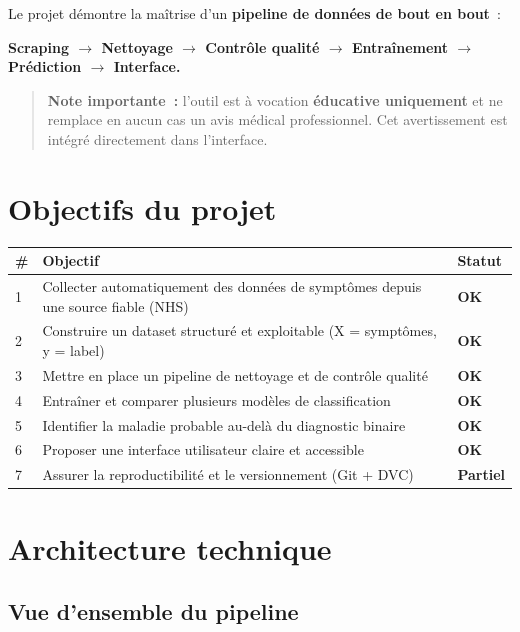 \documentclass[11pt,a4paper]{article}
\newcommand{\ok}{\textcolor{success}{\textbf{OK}}}
\newcommand{\partiel}{\textcolor{warning}{\textbf{Partiel}}}
\begin{document}
Le projet démontre la maîtrise d'un \textbf{pipeline de données de bout en bout}~:
\begin{center}
\textbf{Scraping $\rightarrow$ Nettoyage $\rightarrow$ Contrôle qualité $\rightarrow$ Entraînement $\rightarrow$ Prédiction $\rightarrow$ Interface.}
\end{center}

\begin{quote}
\textcolor{warning}{\textbf{Note importante~:}} l'outil est à vocation \textbf{éducative uniquement} et ne remplace en aucun cas un avis médical professionnel. Cet avertissement est intégré directement dans l'interface.
\end{quote}

\section{Objectifs du projet}

\begin{longtable}{@{}p{0.5cm} p{11.5cm} p{2cm}@{}}
\toprule
\textbf{\#} & \textbf{Objectif} & \textbf{Statut} \\
\midrule
\endhead
1 & Collecter automatiquement des données de symptômes depuis une source fiable (NHS) & \ok \\
2 & Construire un dataset structuré et exploitable (X = symptômes, y = label) & \ok \\
3 & Mettre en place un pipeline de nettoyage et de contrôle qualité & \ok \\
4 & Entraîner et comparer plusieurs modèles de classification & \ok \\
5 & Identifier la maladie probable au-delà du diagnostic binaire & \ok \\
6 & Proposer une interface utilisateur claire et accessible & \ok \\
7 & Assurer la reproductibilité et le versionnement (Git + DVC) & \partiel \\
\bottomrule
\end{longtable}

\section{Architecture technique}

\subsection{Vue d'ensemble du pipeline}
\end{document}
